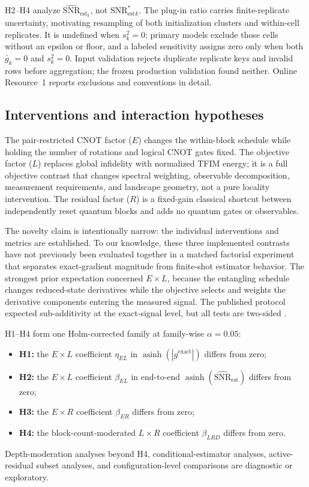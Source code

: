 \documentclass[pdflatex,sn-basic,Numbered]{sn-jnl}
\newcommand{\snrstar}{\mathrm{SNR}^{*}_{\mathrm{est}}}
\newcommand{\snrest}{\widehat{\mathrm{SNR}}_{\mathrm{est}}}
\begin{document}
H2--H4 analyze $\snrest_k$, not $\snrstar_k$. The plug-in ratio carries finite-replicate uncertainty, motivating resampling of both initialization clusters and within-cell replicates. It is undefined when $s_k^2=0$; primary models exclude those cells without an epsilon or floor, and a labeled sensitivity assigns zero only when both $\bar g_k=0$ and $s_k^2=0$. Input validation rejects duplicate replicate keys and invalid rows before aggregation; the frozen production validation found neither. Online Resource~1 reports exclusions and conventions in detail.

\subsection{Interventions and interaction hypotheses}

The pair-restricted CNOT factor ($E$) changes the within-block schedule while holding the number of rotations and logical CNOT gates fixed. The objective factor ($L$) replaces global infidelity with normalized TFIM energy; it is a full objective contrast that changes spectral weighting, observable decomposition, measurement requirements, and landscape geometry, not a pure locality intervention. The residual factor ($R$) is a fixed-gain classical shortcut between independently reset quantum blocks and adds no quantum gates or observables.

The novelty claim is intentionally narrow: the individual interventions and metrics are established. To our knowledge, these three implemented contrasts have not previously been evaluated together in a matched factorial experiment that separates exact-gradient magnitude from finite-shot estimator behavior. The strongest prior expectation concerned $E\times L$, because the entangling schedule changes reduced-state derivatives while the objective selects and weights the derivative components entering the measured signal. The published protocol expected sub-additivity at the exact-signal level, but all tests are two-sided \cite{shen2026gradient}.

H1--H4 form one Holm-corrected family at family-wise $\alpha=0.05$:
\begin{itemize}
\item \textbf{H1:} the $E\times L$ coefficient $\eta_{EL}$ in $\operatorname{asinh}(|g^{\mathrm{exact}}|)$ differs from zero;
\item \textbf{H2:} the $E\times L$ coefficient $\beta_{EL}$ in end-to-end $\operatorname{asinh}(\snrest)$ differs from zero;
\item \textbf{H3:} the $E\times R$ coefficient $\beta_{ER}$ differs from zero;
\item \textbf{H4:} the block-count-moderated $L\times R$ coefficient $\beta_{LRD}$ differs from zero.
\end{itemize}
Depth-moderation analyses beyond H4, conditional-estimator analyses, active-residual subset analyses, and configuration-level comparisons are diagnostic or exploratory.
\end{document}
